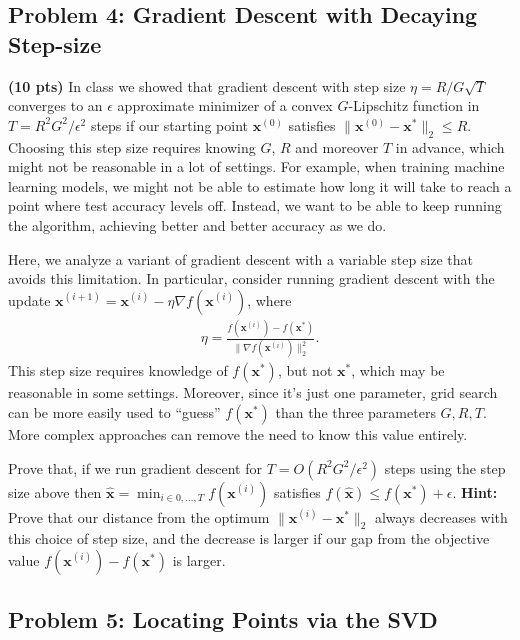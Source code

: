 \documentclass[10pt]{article}
\newcommand{\bv}[1]{\mathbf{#1}}
\begin{document}
\subsection{Problem 4: Gradient Descent with Decaying Step-size}
\textbf{(10 pts)}
In class we showed that gradient descent with step size $\eta = R/G\sqrt{T}$ converges to an $\epsilon$ approximate minimizer of a convex $G$-Lipschitz function in $T = R^2G^2/\epsilon^2$ steps if our starting point $\bv{x}^{(0)}$ satisfies $\|\bv{x}^{(0)} - \bv{x}^*\|_2 \leq R$. 
Choosing this step size requires knowing $G$, $R$ and moreover $T$ in advance, which might not be reasonable in a lot of settings. For example, when training machine learning models, we might not be able to estimate how long it will take to reach a point where test accuracy levels off. Instead, we want to be able to keep running the algorithm, achieving better and better accuracy as we do. 

Here, we analyze a variant of gradient descent with a variable step size that avoids this limitation. In particular, consider running gradient descent with the update $\bv{x}^{(i+1)} = \bv{x}^{(i)}- \eta \nabla f(\bv{x}^{(i)})$, where
\begin{align*}
	\eta = \frac{f(\bv{x}^{(i)}) - f(\bv{x}^{*})}{\|\nabla f(\bv{x}^{(i)})\|_2^2}.
\end{align*}
This step size requires knowledge of $f(\bv{x}^{*})$, but not $\bv{x}^*$, which may be reasonable in some settings. Moreover, since it's just one parameter, grid search can be more easily used to ``guess'' $f(\bv{x}^{*})$ than the three parameters $G,R,T$. More complex approaches can remove the need to know this value entirely.

Prove that, if we run gradient descent for $T = O(R^2G^2/\epsilon^2)$ steps using the step size above then $\hat{\bv{x}} = \min_{i \in 0, \ldots, T}f(\bv{x}^{(i)})$ satisfies $f(\hat{\bv{x}}) \leq f(\bv{x}^*) + \epsilon$. \textbf{Hint:} Prove that our distance from the optimum $\|\bv{x}^{(i)} - \bv{x}^*\|_2$ {always decreases} with this choice of step size, and the decrease is larger if our gap from the objective value $f(\bv{x}^{(i)}) - f(\bv{x}^{*})$ is larger.

\subsection{Problem 5: Locating Points via the SVD}
	
\end{document}
